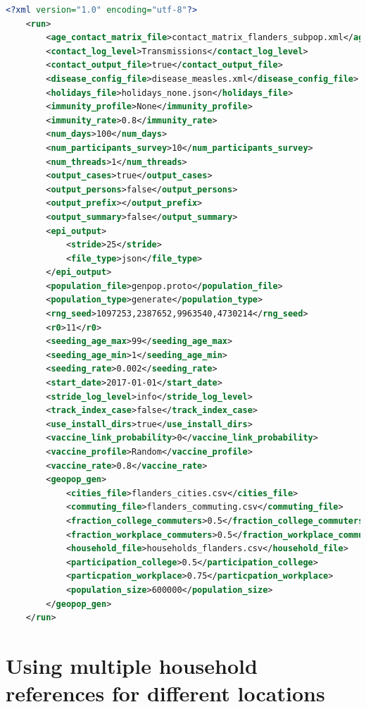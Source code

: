 \begin{center}
	\begin{lstlisting}[language=XML,caption=Config xml file example to make epi-output.]
	<?xml version="1.0" encoding="utf-8"?>
	<run>
		<age_contact_matrix_file>contact_matrix_flanders_subpop.xml</age_contact_matrix_file>
		<contact_log_level>Transmissions</contact_log_level>
		<contact_output_file>true</contact_output_file>
		<disease_config_file>disease_measles.xml</disease_config_file>
		<holidays_file>holidays_none.json</holidays_file>
		<immunity_profile>None</immunity_profile>
		<immunity_rate>0.8</immunity_rate>
		<num_days>100</num_days>
		<num_participants_survey>10</num_participants_survey>
		<num_threads>1</num_threads>
		<output_cases>true</output_cases>
		<output_persons>false</output_persons>
		<output_prefix></output_prefix>
		<output_summary>false</output_summary>
		<epi_output>
		    <stride>25</stride>
		    <file_type>json</file_type>
		</epi_output>
		<population_file>genpop.proto</population_file>
		<population_type>generate</population_type>
		<rng_seed>1097253,2387652,9963540,4730214</rng_seed>
		<r0>11</r0>
		<seeding_age_max>99</seeding_age_max>
		<seeding_age_min>1</seeding_age_min>
		<seeding_rate>0.002</seeding_rate>
		<start_date>2017-01-01</start_date>
		<stride_log_level>info</stride_log_level>
		<track_index_case>false</track_index_case>
		<use_install_dirs>true</use_install_dirs>
		<vaccine_link_probability>0</vaccine_link_probability>
		<vaccine_profile>Random</vaccine_profile>
		<vaccine_rate>0.8</vaccine_rate>
		<geopop_gen>
		    <cities_file>flanders_cities.csv</cities_file>
			<commuting_file>flanders_commuting.csv</commuting_file>
			<fraction_college_commuters>0.5</fraction_college_commuters>
			<fraction_workplace_commuters>0.5</fraction_workplace_commuters>
			<household_file>households_flanders.csv</household_file>
			<participation_college>0.5</participation_college>
			<particpation_workplace>0.75</particpation_workplace>
			<population_size>600000</population_size>
		</geopop_gen>
	</run>
	\end{lstlisting}
\end{center}



\section{Using multiple household references for different locations}


